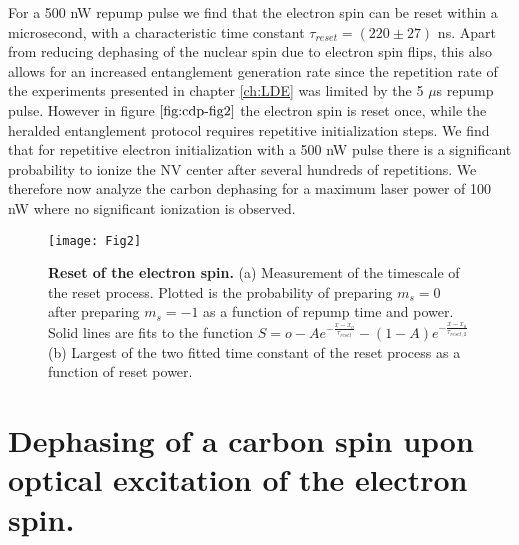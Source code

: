For a 500 nW repump pulse we find that the electron spin can be reset within a microsecond, with a characteristic time constant $\tau_{reset} = (220 \pm 27) $ ns. Apart from reducing dephasing of the nuclear spin due to electron spin flips, this also allows for an increased entanglement generation rate since the repetition rate of the experiments presented in chapter \ref{ch:LDE} was limited by the 5 $\mu$s repump pulse. However in figure $\ref{fig:cdp-fig2}$ the electron spin is reset once, while the heralded entanglement protocol requires repetitive initialization steps. We find that for repetitive electron initialization with a 500 nW pulse there is a significant probability to ionize the NV center after several hundreds of repetitions. We therefore now analyze the carbon dephasing for a maximum laser power of 100 nW where no significant ionization is observed.

 \begin{figure*}
	\centering
	\texttt{[image: Fig2]}
	\caption{\label{fig:cdp-fig2} \textbf{Reset of the electron spin.} (a) Measurement of the timescale of the reset process. Plotted is the probability of preparing $m_s = 0$ after preparing $m_s = -1$ as a function of repump time and power. Solid lines are fits to the function $S = o - A e^{-\frac{x-x_o}{\tau_{reset}}}-(1-A) e^{-\frac{x-x_o}{\tau_{reset,2}}}$ (b) Largest of the two fitted time constant of the reset process as a function of reset power.}
\end{figure*}

\section{Dephasing of a carbon spin upon optical excitation of the electron spin.}

